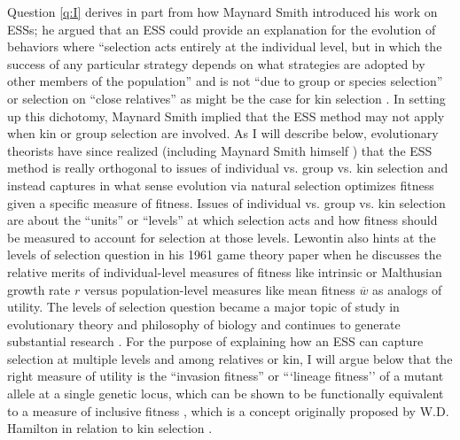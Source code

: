 \documentclass[11pt]{article}
\newcommand{\mean}[1]{\overline{#1}}
\begin{document}
Question \ref{q:I} derives in part from how Maynard Smith introduced his work on ESSs; he argued that an ESS could provide an explanation for the evolution of behaviors where ``selection acts entirely at the individual level, but in which the success of any particular strategy depends on what strategies are adopted by other members of the population'' \cite[p. 210]{Maynard-Smith:1974} and is not ``due to group or species selection'' \cite[p. 15]{Maynard-Smith:Price:1973} or selection on ``close relatives'' \cite[p. 210]{Maynard-Smith:1974} as might be the case for kin selection \cite{Hamilton:1964}. In setting up this dichotomy, Maynard Smith implied that the ESS method may not apply when kin or group selection are involved. As I will describe below, evolutionary theorists have since realized (including Maynard Smith himself \cite[p. 33]{MaynardSmith:1978}) that the ESS method is really orthogonal to issues of individual vs. group vs. kin selection and instead captures in what sense evolution via natural selection optimizes fitness given a specific measure of fitness. Issues of individual vs. group vs. kin selection are about the ``units'' or ``levels'' at which selection acts and how fitness should be measured to account for selection at those levels. Lewontin also hints at the levels of selection question in his 1961 game theory paper when he discusses the relative merits of individual-level measures of fitness like intrinsic or Malthusian growth rate $r$ versus population-level measures like mean fitness $\mean{w}$ \cite[pp. 400-401]{Lewontin:1961} as analogs of utility. The levels of selection question became a major topic of study in evolutionary theory \cite[e.g.,][]{Lewontin:1970,Dawkins:1982,Wilson:Sober:1989,Maynard-Smith:Szathmary:1995,Wilson:1997,Michod:1999,Michod:2006,Szathmary:2015} and philosophy of biology \cite{Hull:1980,Brandon:1982,Damuth:Heisler:1988,Lloyd:1992,Lloyd:1994,Sober:Wilson:1994,Okasha:2006,Okasha:2016} and continues to generate substantial research \cite[e.g.,][]{Black:Bourrat:2020,Cooney:Mori:2022,Veit:2022}. For the purpose of explaining how an ESS can capture selection at multiple levels and among relatives or kin, I will argue below that the right measure of utility is the ``invasion fitness'' \cite{Metz:Nisbet:1992,Heino:Metz:1998} or ```lineage fitness'' \cite{Lehmann:Alger:2015,Akcay:VanCleve:2016,Lehmann:Mullon:2016} of a mutant allele at a single genetic locus, which can be shown to be functionally equivalent to a measure of inclusive fitness \cite{Lehmann:Mullon:2016,Lehmann:Rousset:2020}, which is a concept originally proposed by W.D. Hamilton in relation to kin selection \cite{Hamilton:1964}.
\end{document}
